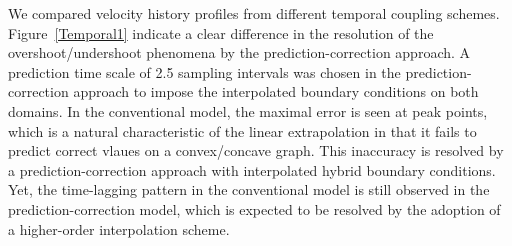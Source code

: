 \documentclass[preprint,12pt]{elsarticle}
\begin{document}

We compared velocity history profiles from different temporal coupling schemes. Figure~\ref{Temporal1} indicate a clear difference in the resolution of the overshoot/undershoot phenomena by the prediction-correction approach. A prediction time scale of 2.5 sampling intervals was chosen in the prediction-correction approach to impose the interpolated boundary conditions on both domains. In the conventional model, the maximal error is seen at peak points, which is a natural characteristic of the linear extrapolation in that it fails to predict correct vlaues on a convex/concave graph. This inaccuracy is resolved by a prediction-correction approach with interpolated hybrid boundary conditions. Yet, the time-lagging pattern in the conventional model is still observed in the prediction-correction model, which is expected to be resolved by the adoption of a higher-order interpolation scheme.
\end{document}
